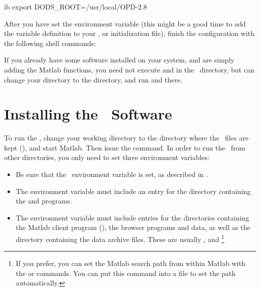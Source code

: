 \begin{vcode}{ib}
export DODS_ROOT=/usr/local/OPD-2.8
\end{vcode}

After you have set the environment variable (this might be a good time
to add the variable definition to your ,  or
 initialization file), finish the configuration with the
following shell commands:


If you already have some \opendap software installed on your system, and
are simply adding the Matlab functions, you need not execute
 and  in the \DODSroot\ directory, but 
can change your directory to the 
directory, and run  and  there.

\section{Installing the \GUI\ Software}
\label{install,install}

To run the \GUI, change your working directory to the directory where
the \GUI\ files are kept (), and
start Matlab. Then issue the  command.
In order to run the \GUI\ from other directories, you only need to set 
three environment variables:

\begin{itemize}
\item
Be sure that the \DODSroot\ environment variable is set, as
described in .

\item
The  environment variable must include an entry for the 
\DODSroot{} directory containing the  and
 programs.

\item The  environment variable must include entries
  for the directories containing the Matlab client program
  (), the browser programs and data, as well as the
  directory containing the data archive files. These are usually
  \DODSroot{}, \DODSroot{} and
  \DODSroot{}\footnote{If you prefer, you can
    set the Matlab search path from within Matlab with the
     or  commands. You can put this command
    into a  file to set the path automatically.}

\end{itemize}

